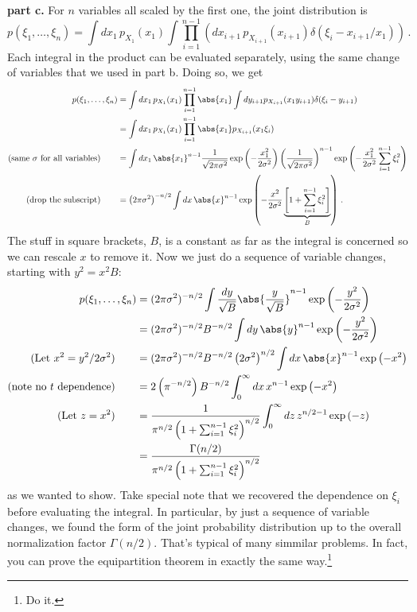 \textbf{part c.} For $n$ variables all scaled by the first one, the joint distribution is
\begin{equation*}
  p(\xi_1,\ldots,\xi_n)
  = \int dx_1 \, p_{X_1}(x_1)
    \int \prod_{i=1}^{n-1} \left( dx_{i+1} \, p_{X_{i+1}}(x_{i+1}) \delta(\xi_i - x_{i+1} / x_1) \right)
  \, .
\end{equation*}
Each integral in the product can be evaluated separately, using the same change of variables that we used in part b.
Doing so, we get
\begin{align*}
  p(\xi_1,\ldots,\xi_n)
  &= \int dx_1 \, p_{X_1}(x_1)
    \prod_{i=1}^{n-1} \abs{x_1} \int dy_{i+1} p_{X_{i+1}}(x_1 y_{i+1}) \delta(\xi_i - y_{i+1}) \\
  &= \int dx_1 \, p_{X_1}(x_1)
    \prod_{i=1}^{n-1} \abs{x_1} p_{X_{i+1}}(x_1 \xi_i) \\
  \text{(same $\sigma$ for all variables)} \qquad
  &= \int dx_1 \,
    \abs{x_1}^{n-1}
    \frac{1}{\sqrt{2 \pi \sigma^2}} \exp \left( - \frac{x_1^2}{2 \sigma^2} \right)
    \left( \frac{1}{\sqrt{2\pi \sigma^2}} \right)^{n-1}
    \exp \left( - \frac{x_1^2}{2 \sigma^2} \sum_{i=1}^{n-1} \xi_i^2 \right)
    \\
  \text{(drop the subscript)} \qquad
  &= \left( 2\pi \sigma^2 \right)^{-n/2} \int dx \,
    \abs{x}^{n-1}
    \exp \left( - \frac{x^2}{2 \sigma^2} \underbrace{\left[ 1 + \sum_{i=1}^{n-1} \xi_i^2 \right]}_B \right)
    \, .
\end{align*}
The stuff in square brackets, $B$, is a constant as far as the integral is concerned so we can rescale $x$ to remove it.
Now we just do a sequence of variable changes, starting with $y^2 = x^2 B$:
\begin{align*}
  p(\xi_1,\ldots,\xi_n)
  &= (2 \pi \sigma^2)^{-n/2} \int \frac{dy}{\sqrt{B}} \abs{\frac{y}{\sqrt{B}}}^{n-1}
    \exp \left( - \frac{y^2}{2\sigma^2} \right)
  \\
  &= (2 \pi \sigma^2)^{-n/2} B^{-n/2} \int dy \, \abs{y}^{n-1}
    \exp \left( - \frac{y^2}{2\sigma^2} \right)
    \\
  \text{(Let $x^2 = y^2 / 2 \sigma^2$)} \qquad
  &= (2 \pi \sigma^2)^{-n/2} B^{-n/2} \left( 2 \sigma^2 \right)^{n/2}
    \int dx \, \abs{x}^{n-1} \exp \left( - x^2 \right)
    \\
  \text{(note no $t$ dependence)} \qquad
  &= 2 \left( \pi^{-n/2}\right) B^{-n/2}
    \int_0^\infty dx \, x^{n-1} \exp \left( - x^2 \right)
    \\
  \text{(Let $z = x^2$)} \qquad
  &= \frac{1}{\pi^{n/2} \left( 1 + \sum_{i=1}^{n-1} \xi_i^2 \right)^{n/2}}
    \int_0^\infty dz \, z^{n/2 - 1} \exp \left( - z \right)
    \\
  &= \frac{\Gamma(n/2)}{\pi^{n/2} \left( 1 + \sum_{i=1}^{n-1} \xi_i^2 \right)^{n/2}}
\end{align*}
as we wanted to show.
Take special note that we recovered the dependence on $\xi_i$ before evaluating the integral.
In particular, by just a sequence of variable changes, we found the form of the joint probability distribution up to the overall normalization factor $\Gamma(n/2)$.
That's typical of many simmilar problems.
In fact, you can prove the equipartition theorem in exactly the same way.\footnote{Do it.}
